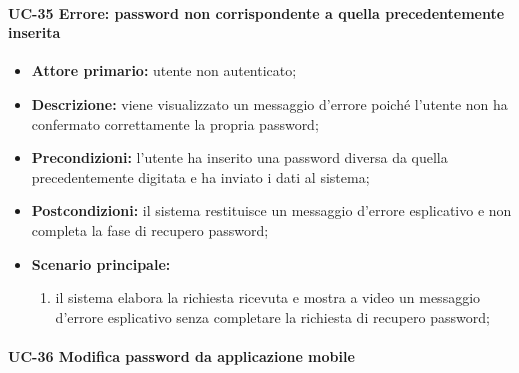 \paragraph{UC-35 Errore: password non corrispondente a quella precedentemente inserita}

	\begin{itemize}
		\item \textbf{Attore primario:} utente non autenticato;

		\item \textbf{Descrizione:}  viene visualizzato un messaggio d'errore poiché l'utente non ha confermato correttamente la propria password;

		\item \textbf{Precondizioni:} l'utente ha inserito una password diversa da quella precedentemente digitata e ha inviato i dati al sistema;

		\item \textbf{Postcondizioni:} il sistema restituisce un messaggio d'errore esplicativo e non completa la fase di recupero password;

		\item \textbf{Scenario principale:}
	  		\begin{enumerate}
		  		\item il sistema elabora la richiesta ricevuta e mostra a video un messaggio d'errore esplicativo senza completare la richiesta di recupero password; 
	  		\end{enumerate}
	\end{itemize}

\paragraph{UC-36 Modifica password da applicazione mobile}

